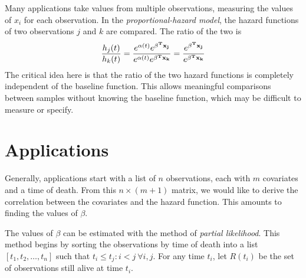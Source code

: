 \documentclass[12pt]{article}
\begin{document}
Many applications take values from multiple observations, measuring the values of $x_i$ for each observation.  %
In the \textit{proportional-hazard model}, the hazard functions of two observations $j$ and $k$ are compared.  The ratio of the two is
\begin{equation}
\frac{h_j(t)}{h_k(t)} = \frac{e^{\alpha(t)} e^{\bold{\beta^T x_j}} }{e^{\alpha(t)} e^{\bold{\beta^T x_k}} } = \frac{e^{\bold{\beta^T x_j} }}{ e^{\bold{\beta^T x_k}}}
\end{equation}
The critical idea here is that the ratio of the two hazard functions is completely independent of the baseline function.  This allows meaningful comparisons between samples without knowing the baseline function, which may be difficult to measure or specify.

\section{Applications}\label{cox:Application}
Generally, applications start with a list of $n$ observations, each with $m$ covariates and a time of death.  From this $n \times (m+1)$ matrix, we would like to derive the correlation between the covariates and the hazard function.  This amounts to finding the values of  $\beta$.  

The values of $\beta$ can be estimated with the method of \textit{partial likelihood}.  This method begins by sorting the observations by time of death into a list $[t_1, t_2, \dots, t_n]$ such that $t_i \le t_j : i < j\ \forall i,j$.  For any time $t_i$, let $R(t_i)$ be the set of observations still alive at time $t_i$.  
\end{document}
